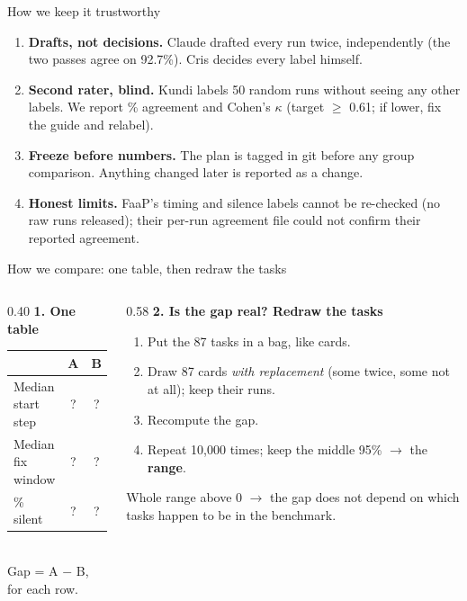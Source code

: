 \documentclass[aspectratio=169,11pt]{beamer}
\begin{document}
\begin{frame}{How we keep it trustworthy}
  \begin{enumerate}
    \item \textbf{Drafts, not decisions.} Claude drafted every run twice, independently
      (the two passes agree on 92.7\%). Cris decides every label himself.
    \item \textbf{Second rater, blind.} Kundi labels 50 random runs without seeing any other labels.
      We report \% agreement and Cohen's $\kappa$ (target $\geq$ 0.61; if lower, fix the guide and relabel).
    \item \textbf{Freeze before numbers.} The plan is tagged in git before any group comparison.
      Anything changed later is reported as a change.
    \item \textbf{Honest limits.} FaaP's timing and silence labels cannot be re-checked (no raw runs released);
      their per-run agreement file could not confirm their reported agreement.
  \end{enumerate}
\end{frame}

\begin{frame}{How we compare: one table, then redraw the tasks}
  \begin{columns}[T]
    \begin{column}{0.40\textwidth}
      \small
      \textbf{1. One table}\\[4pt]
      \begin{tabular}{@{}lcc@{}}
        \toprule
        & \textbf{A} & \textbf{B} \\
        \midrule
        Median start step & ? & ? \\
        Median fix window & ? & ? \\
        \% silent & ? & ? \\
        \bottomrule
      \end{tabular}\\[6pt]
      Gap = A $-$ B, for each row.
    \end{column}
    \begin{column}{0.58\textwidth}
      \small
      \textbf{2. Is the gap real? Redraw the tasks}
      \begin{enumerate}
        \item Put the 87 tasks in a bag, like cards.
        \item Draw 87 cards \emph{with replacement} (some twice, some not at all); keep their runs.
        \item Recompute the gap.
        \item Repeat 10,000 times; keep the middle 95\% $\rightarrow$ the \textbf{range}.
      \end{enumerate}
      Whole range above 0 $\rightarrow$ the gap does not depend on which tasks happen to be in the benchmark.
    \end{column}
  \end{columns}
\end{frame}
\end{document}
